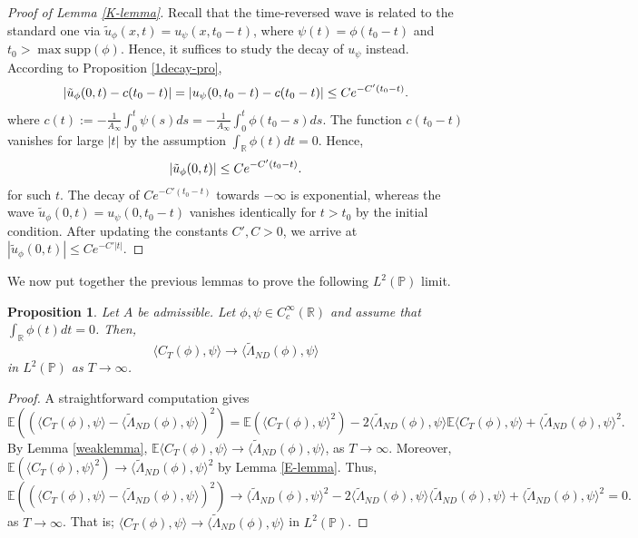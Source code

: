 \documentclass[10pt,a4paper]{article}
\theoremstyle{plain}
\newtheorem{proposition}[theorem]{Proposition}
\theoremstyle{definition}
\theoremstyle{remark}
\numberwithin{equation}{section}
\newcommand{\R}{\mathbb{R}}
\newcommand{\E}{\mathbb{E}} %
\DeclarePairedDelimiter\abs{\lvert}{\rvert} %
\begin{document}
\begin{proof}[Proof of Lemma \ref{K-lemma}]
Recall that the time-reversed wave is related to the standard one via $\tilde{u}_\phi (x,t) = u_{\psi} (x,t_0- t)$, where $ \psi (t) = \phi(t_0- t)$ and $t_0  > \max \text{supp} (\phi) $. 
Hence, it suffices to study the decay of $ u_{\psi}$ instead. 
According to Proposition \ref{1decay-pro}, 
\[
    \abs{\tilde{u}_\phi (0,t) - c(t_0-t)}=     \abs{u_\psi (0,t_0-t) - c(t_0-t)} \leq  C e^{-C' (t_0-t)}.
\]
where $c(t) :=  -\frac{1}{A_\infty} \int_0^t \psi (s) ds = -\frac{1}{A_\infty}\int_0^t \phi (t_0- s) ds $. The function $c(t_0-t)  $ vanishes for large $|t| $ by the assumption $\int_{\R} \phi (t) dt = 0$. Hence, 
\[
    \abs{\tilde{u}_\phi (0,t) } \leq   C e^{-C' (t_0-t)}.
\]
for such  $t$. 
The decay of  $C e^{-C' (t_0-t)}$ towards $-\infty$ is exponential, whereas 
 the wave $\tilde{u}_\phi (0,t) = u_\psi (0,t_0-t) $ vanishes identically for $t > t_0$ by the initial condition. 
After updating the constants $C',C>0$, we arrive at $|\tilde{u}_\phi (0,t) | \leq   C e^{-C' |t|}$. 




\end{proof}

We now put together the previous lemmas to prove the following $L^2( \mathbb{P})$ limit.

\begin{proposition}\label{L2-con}
Let $A$ be admissible. Let $\phi, \psi \in C^\infty_c(\R)$ and assume that $\int_{\R}  \phi (t) dt = 0$. 
Then,
\[
\langle C_T(\phi) , \psi \rangle  \to \langle \tilde\Lambda_{ND} (\phi ), \psi \rangle 
\]
in $L^2( \mathbb{P})$ as $T \to \infty$. 
\end{proposition}

\begin{proof}
A straightforward computation gives 
\[
\E \left( \left( \langle C_T(\phi) , \psi \rangle  - \langle \tilde\Lambda_{ND} (\phi ), \psi \rangle  \right)^2 \right)= \E \left( \langle C_T(\phi) , \psi \rangle^2   \right) - 2   \langle \tilde\Lambda_{ND} (\phi ), \psi \rangle \E  \langle C_T(\phi) , \psi \rangle   +  \langle \tilde\Lambda_{ND} (\phi ), \psi \rangle^2. 
\]
By Lemma \ref{weaklemma}, $ \E  \langle C_T(\phi) , \psi \rangle \to  \langle \tilde\Lambda_{ND} (\phi ), \psi \rangle$, as $T \to \infty$. 
Moreover,  $ \E (  \langle C_T(\phi) , \psi \rangle^2 ) \to  \langle \tilde\Lambda_{ND} (\phi ), \psi \rangle^2$ by Lemma \ref{E-lemma}. 
Thus, 
\[
 \E \left( \left( \langle C_T(\phi) , \psi \rangle  - \langle \tilde\Lambda_{ND} (\phi ), \psi \rangle  \right)^2 \right)  \to  \langle \tilde\Lambda_{ND} (\phi ), \psi \rangle^2 - 2   \langle \tilde\Lambda_{ND} (\phi ), \psi \rangle  \langle \tilde\Lambda_{ND} (\phi ), \psi \rangle+ \langle \tilde\Lambda_{ND} (\phi ), \psi \rangle^2 = 0.
\]
as $T \to \infty$. That is; 
$
\langle C_T(\phi) , \psi \rangle  \to \langle \tilde\Lambda_{ND} (\phi ), \psi \rangle 
$
in $L^2( \mathbb{P})$. 
\end{proof}
\end{document}
